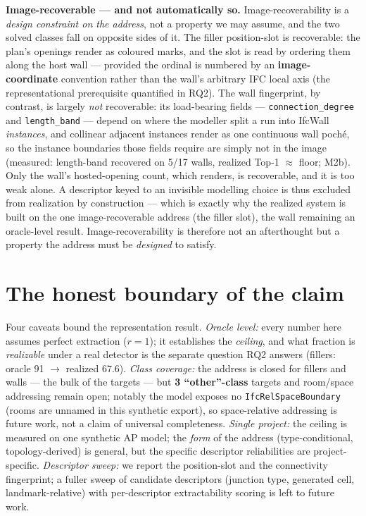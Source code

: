 \noindent\textbf{Image-recoverable --- and not automatically so.} Image-recoverability is a
\emph{design constraint on the address}, not a property we may assume, and the two solved classes fall
on opposite sides of it. The filler position-slot is recoverable: the plan's openings render as
coloured marks, and the slot is read by ordering them along the host wall --- provided the ordinal is
numbered by an \textbf{image-coordinate} convention rather than the wall's arbitrary IFC local axis
(the representational prerequisite quantified in RQ2). The wall fingerprint, by contrast, is largely
\emph{not} recoverable: its load-bearing fields --- \texttt{connection\_degree} and
\texttt{length\_band} --- depend on where the modeller split a run into IfcWall \emph{instances}, and
collinear adjacent instances render as one continuous wall poch\'e, so the instance boundaries those
fields require are simply not in the image (measured: length-band recovered on 5/17 walls, realized
Top-1 $\approx$ floor; M2b). Only the wall's hosted-opening count, which renders, is recoverable, and
it is too weak alone. A descriptor keyed to an invisible modelling choice is thus excluded from
realization by construction --- which is exactly why the realized system is built on the one
image-recoverable address (the filler slot), the wall remaining an oracle-level result.
Image-recoverability is therefore not an afterthought but a property the address must be \emph{designed}
to satisfy.

\section{The honest boundary of the claim}

Four caveats bound the representation result. \emph{Oracle level:} every number here assumes perfect
extraction ($r = 1$); it establishes the \emph{ceiling}, and what fraction is \emph{realizable} under
a real detector is the separate question RQ2 answers (fillers: oracle 91 $\to$ realized 67.6).
\emph{Class coverage:} the address is closed for fillers and walls --- the bulk of the targets --- but
\textbf{3 ``other''-class} targets and room/space addressing remain open; notably the model exposes no
\texttt{IfcRelSpaceBoundary} (rooms are unnamed in this synthetic export), so space-relative addressing
is future work, not a claim of universal completeness. \emph{Single project:} the ceiling is measured
on one synthetic AP model; the \emph{form} of the address (type-conditional, topology-derived) is
general, but the specific descriptor reliabilities are project-specific. \emph{Descriptor sweep:} we
report the position-slot and the connectivity fingerprint; a fuller sweep of candidate descriptors
(junction type, generated cell, landmark-relative) with per-descriptor extractability scoring is left
to future work.

